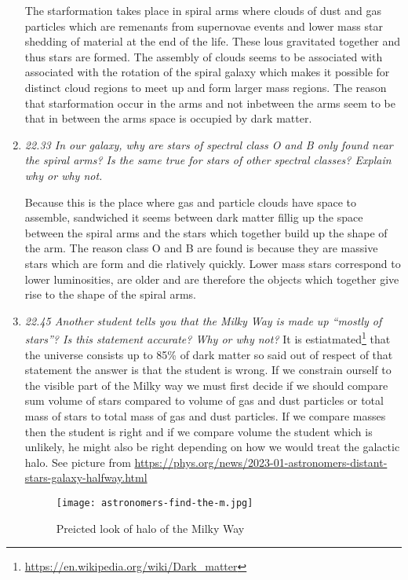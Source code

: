 \documentclass[./exercises.tex]{subfiles}
\begin{document}
\begin{enumerate}
The starformation takes place in spiral arms where clouds of dust and gas particles which are
remenants from supernovae events and lower mass star shedding of material at the end of the life.
These lous gravitated together and thus stars are formed. The assembly of clouds seems to be associated
with associated with the rotation of the spiral galaxy which makes it possible for distinct cloud regions
to meet up and form larger mass regions. The reason that starformation occur in the arms and 
not inbetween the arms seem to be that in between the arms space is occupied by dark matter. 


\item\textit{22.33 In our galaxy, why are stars of spectral class O
and B only found near the spiral
arms? Is the same true for stars of other spectral classes? Explain why or why not.}

Because this is the place where gas and particle clouds have space to assemble, sandwiched it seems between
dark matter fillig up the space between the spiral arms and the stars which together build up
the shape of the arm. The reason class
O and B are found is because they are massive stars which are form and die rlatively quickly.
Lower mass stars correspond to lower luminosities, are older and are therefore the objects which together
give rise to the shape of the spiral arms.

\item\textit{22.45 Another student tells you that the Milky Way is made up “mostly of stars”? Is this
statement accurate? Why or why not?}
It is estiatmated\footnote{\url{https://en.wikipedia.org/wiki/Dark_matter}} that the universe
consists up to 85\% of dark matter so said out of respect of that statement the answer is that the
student is wrong. If we constrain ourself to the visible part of the Milky way we must first
decide if we should compare sum volume of stars compared to volume of gas and dust particles or
total mass of stars to total mass of gas and dust particles. If we compare masses then the student
is right and if we compare volume the student which is unlikely, he might also be right depending
on how we would treat the galactic halo. See picture from
\url{https://phys.org/news/2023-01-astronomers-distant-stars-galaxy-halfway.html}
\begin{figure}[H]
  \centering
  \texttt{[image: astronomers-find-the-m.jpg]}
  \caption{Preicted look of halo of the Milky Way}
  \label{fig:fig4}
\end{figure}


\end{enumerate}
\end{document}
